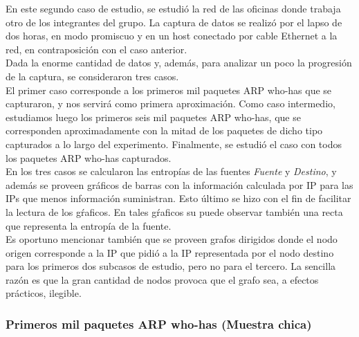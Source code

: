 \indent \indent  En este segundo caso de estudio, se estudió la red de las oficinas donde trabaja otro de los integrantes del grupo. La captura de datos se realizó por el lapso de dos horas, en modo promiscuo y en un host conectado por cable Ethernet a la red, en contraposición con el caso anterior.\\
\indent Dada la enorme cantidad de datos y, además, para analizar un poco la progresión de la captura, se consideraron tres casos.\\
\indent El primer caso corresponde a los primeros mil paquetes ARP who-has que se capturaron, y nos servirá como primera aproximación. Como caso intermedio, estudiamos luego los primeros seis mil paquetes ARP who-has, que se corresponden aproximadamente con la mitad de los paquetes de dicho tipo capturados a lo largo del experimento. Finalmente, se estudió el caso con todos los paquetes ARP who-has capturados.\\
\indent En los tres casos se calcularon las entropías de las fuentes \textit{Fuente} y \textit{Destino}, y además se proveen gráficos de barras con la información calculada por IP para las IPs que menos información suministran. Esto último se hizo con el fin de facilitar la lectura de los gŕaficos. En tales gŕaficos su puede observar también una recta que representa la entropía de la fuente.\\
\indent Es oportuno mencionar también que se proveen grafos dirigidos donde el nodo origen corresponde a la IP que pidió a la IP representada por el nodo destino para los primeros dos subcasos de estudio, pero no para el tercero. La sencilla razón es que la gran cantidad de nodos provoca que el grafo sea, a efectos prácticos, ilegible.\\

\subsubsection{Primeros mil paquetes ARP who-has (Muestra chica)}


